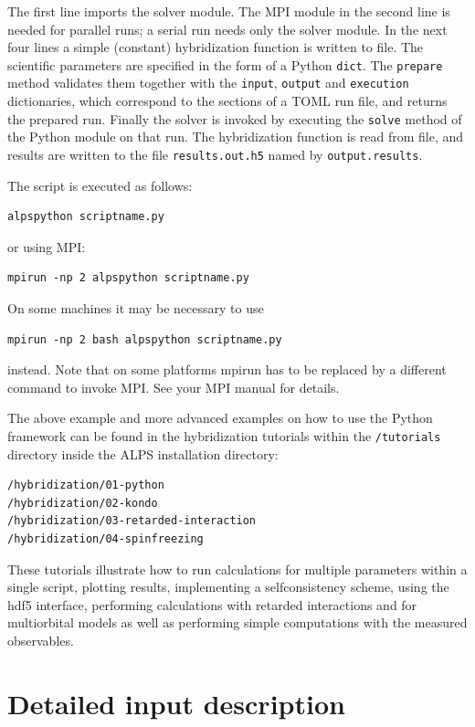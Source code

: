 \documentclass[aps,prb,floatfix,superscriptaddress,twocolumn,notitlepage]{revtex4-1}
\begin{document}
The first line imports the solver module. The MPI module in the second line is needed for parallel runs; a serial run needs only the solver module. In the next four lines a simple (constant) hybridization function is written to file.
The scientific parameters are specified in the form of a Python \verb#dict#.
The \verb#prepare# method validates them together with the \verb#input#, \verb#output# and \verb#execution# dictionaries, which correspond to the sections of a TOML run file, and returns the prepared run. Finally the solver is invoked by executing the \verb#solve# method of the Python module on that run. The hybridization function is read from file, and results are written to the file \verb#results.out.h5# named by \verb#output.results#.

The script is executed as follows:
\begin{verbatim}
alpspython scriptname.py
\end{verbatim}
or using MPI:
\begin{verbatim}
mpirun -np 2 alpspython scriptname.py
\end{verbatim}
On some machines it may be necessary to use 
\begin{verbatim}
mpirun -np 2 bash alpspython scriptname.py
\end{verbatim}
instead.
Note that on some platforms mpirun has to be replaced by a different command to invoke MPI. See your MPI manual for details. 

The above example and more advanced examples on how to use the Python framework can be found in the hybridization tutorials within the \verb#/tutorials# directory inside the ALPS installation directory:
\begin{verbatim}
/hybridization/01-python
/hybridization/02-kondo
/hybridization/03-retarded-interaction
/hybridization/04-spinfreezing
\end{verbatim}

These tutorials illustrate how to run calculations for multiple parameters within a single script, plotting results, implementing a selfconsistency scheme, using the hdf5 interface, performing calculations with retarded interactions and for multiorbital models as well as performing simple computations with the measured observables.

\section{Detailed input description}
\end{document}
